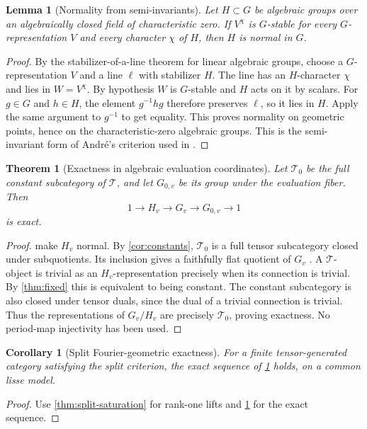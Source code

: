 \documentclass[11pt]{article}
\numberwithin{equation}{section}
\newtheorem{theorem}{Theorem}[section]
\newtheorem{lemma}[lemma]{Lemma}
\newtheorem{corollary}[corollary]{Corollary}
\theoremstyle{definition}
\theoremstyle{remark}
\newcommand{\Tcal}{\mathcal T}
\begin{document}
\begin{lemma}[Normality from semi-invariants]\label{lem:normality}\label{lem:Andre}
Let $H\subset G$ be algebraic groups over an algebraically closed field of
characteristic zero. If $V^\chi$ is $G$-stable for every $G$-representation
$V$ and every character $\chi$ of $H$, then $H$ is normal in $G$.
\end{lemma}
\begin{proof}
By the stabilizer-of-a-line theorem for linear algebraic groups, choose a
$G$-representation $V$ and a line $\ell$ with stabilizer $H$. The line
has an $H$-character $\chi$ and lies in $W=V^\chi$. By hypothesis $W$
is $G$-stable and $H$ acts on it by scalars. For $g\in G$ and $h\in H$,
the element $g^{-1}hg$ therefore preserves $\ell$, so it lies in $H$.
Apply the same argument to $g^{-1}$ to get equality. This proves normality
on geometric points, hence on the characteristic-zero algebraic groups.
This is the semi-invariant form of Andr\'e's criterion used in
\cite{AndreFixed,Mostaed}.
\end{proof}

\begin{theorem}[Exactness in algebraic evaluation coordinates]\label{thm:exact}\label{thm:Galois-exact}
Let $\Tcal_0$ be the full constant subcategory of $\Tcal$, and let
$G_{0,v}$ be its group under the evaluation fiber. Then
\[
 1\longrightarrow H_v\longrightarrow G_v
 \longrightarrow G_{0,v}\longrightarrow1
\]
is exact.
\end{theorem}
\begin{proof}
 make $H_v$ normal. By
\cref{cor:constants}, $\Tcal_0$ is a full tensor subcategory closed
under subquotients. Its inclusion gives a faithfully flat quotient of
$G_v$ \cite[Proposition~2.21(a)]{DeligneMilne}. A $\Tcal$-object is
trivial as an $H_v$-representation precisely when its connection is
trivial. By \cref{thm:fixed} this is equivalent to being constant.
The constant subcategory is also closed under tensor duals, since the dual
of a trivial connection is trivial. Thus the representations of $G_v/H_v$ are precisely $\Tcal_0$, proving
exactness. No period-map injectivity has been used.
\end{proof}

\begin{corollary}[Split Fourier-geometric exactness]
For a finite tensor-generated category satisfying the split criterion,
the exact sequence of \cref{thm:exact} holds, on a common lisse model.
\end{corollary}
\begin{proof}
Use \cref{thm:split-saturation} for rank-one lifts and
\cref{thm:exact} for the exact sequence.
\end{proof}
\end{document}
